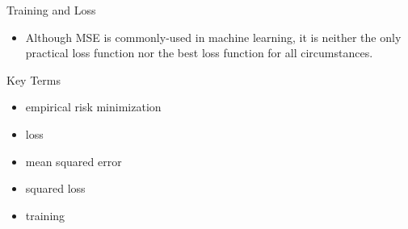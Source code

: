 \documentclass{beamer}
\begin{document}

\begin{frame}{Training and Loss}
\begin{itemize}
    \item Although MSE is commonly-used in machine learning, it is neither the only practical loss function nor the best loss function for all circumstances.
\end{itemize}
\end{frame}


\begin{frame}{Key Terms}
\begin{itemize}
\item empirical risk minimization
\item loss
\item mean squared error
\item squared loss
\item training
\end{itemize}
\end{frame}
\end{document}

